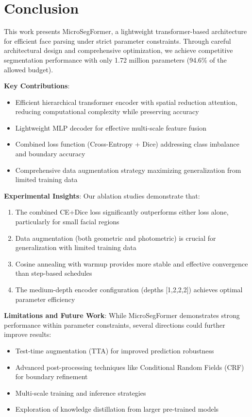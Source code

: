 \section{Conclusion}
\label{sec:conclusion}

This work presents MicroSegFormer, a lightweight transformer-based architecture for efficient face parsing under strict parameter constraints. Through careful architectural design and comprehensive optimization, we achieve competitive segmentation performance with only 1.72 million parameters (94.6\% of the allowed budget).

\textbf{Key Contributions}:
\begin{itemize}
    \item Efficient hierarchical transformer encoder with spatial reduction attention, reducing computational complexity while preserving accuracy
    \item Lightweight MLP decoder for effective multi-scale feature fusion
    \item Combined loss function (Cross-Entropy + Dice) addressing class imbalance and boundary accuracy
    \item Comprehensive data augmentation strategy maximizing generalization from limited training data
\end{itemize}

\textbf{Experimental Insights}:
Our ablation studies demonstrate that:
\begin{enumerate}
    \item The combined CE+Dice loss significantly outperforms either loss alone, particularly for small facial regions
    \item Data augmentation (both geometric and photometric) is crucial for generalization with limited training data
    \item Cosine annealing with warmup provides more stable and effective convergence than step-based schedules
    \item The medium-depth encoder configuration (depths [1,2,2,2]) achieves optimal parameter efficiency
\end{enumerate}

\textbf{Limitations and Future Work}:
While MicroSegFormer demonstrates strong performance within parameter constraints, several directions could further improve results:
\begin{itemize}
    \item Test-time augmentation (TTA) for improved prediction robustness
    \item Advanced post-processing techniques like Conditional Random Fields (CRF) for boundary refinement
    \item Multi-scale training and inference strategies
    \item Exploration of knowledge distillation from larger pre-trained models
\end{itemize}

